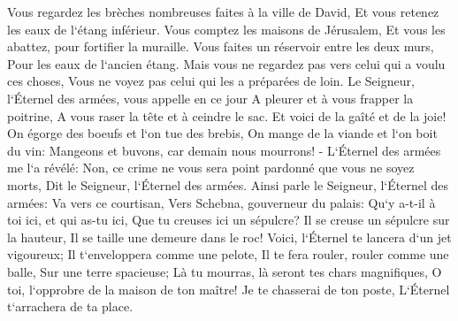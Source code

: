 \verse Vous regardez les brèches nombreuses faites à la ville de David, Et vous retenez les eaux de l`étang inférieur. 
\verse Vous comptez les maisons de Jérusalem, Et vous les abattez, pour fortifier la muraille. 
\verse Vous faites un réservoir entre les deux murs, Pour les eaux de l`ancien étang. Mais vous ne regardez pas vers celui qui a voulu ces choses, Vous ne voyez pas celui qui les a préparées de loin. 
\verse Le Seigneur, l`Éternel des armées, vous appelle en ce jour A pleurer et à vous frapper la poitrine, A vous raser la tête et à ceindre le sac. 
\verse Et voici de la gaîté et de la joie! On égorge des boeufs et l`on tue des brebis, On mange de la viande et l`on boit du vin: Mangeons et buvons, car demain nous mourrons! - 
\verse L`Éternel des armées me l`a révélé: Non, ce crime ne vous sera point pardonné que vous ne soyez morts, Dit le Seigneur, l`Éternel des armées. 
\verse Ainsi parle le Seigneur, l`Éternel des armées: Va vers ce courtisan, Vers Schebna, gouverneur du palais: 
\verse Qu`y a-t-il à toi ici, et qui as-tu ici, Que tu creuses ici un sépulcre? Il se creuse un sépulcre sur la hauteur, Il se taille une demeure dans le roc! 
\verse Voici, l`Éternel te lancera d`un jet vigoureux; Il t`enveloppera comme une pelote, 
\verse Il te fera rouler, rouler comme une balle, Sur une terre spacieuse; Là tu mourras, là seront tes chars magnifiques, O toi, l`opprobre de la maison de ton maître! 
\verse Je te chasserai de ton poste, L`Éternel t`arrachera de ta place. 
